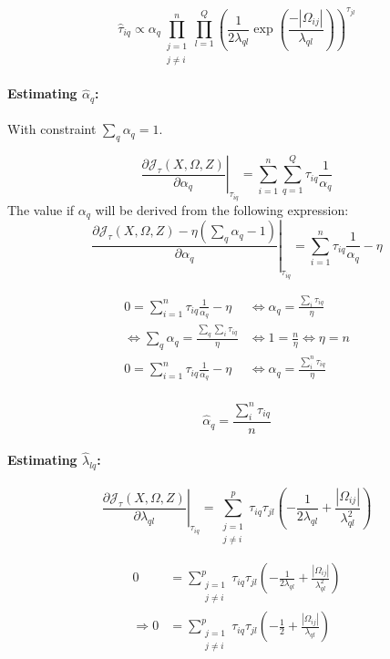 \documentclass[10pt]{article}
\begin{document}
\[\boxed{\hat{\tau}_{iq} \propto \alpha_q \prod_{\substack{j = 1 \\  j\neq i}}^n \prod_{l = 1}^Q \left( \frac{1}{2\lambda_{ql}} \exp\left(\frac{-|\Omega_{ij}|}{\lambda_{ql}} \right) \right)^{\tau_{jl}}} \]


\paragraph{Estimating $\hat{\alpha}_{q}$:} With constraint $\sum_q \alpha_q = 1$.

\[ \left. \frac{\partial\mathcal{J}_\tau(X, \Omega, Z)}{\partial \alpha_q}  \right| _{\tau_{iq}} = \sum_{i=1}^n \sum_{q = 1}^Q \tau_{iq} \frac{1}{\alpha_q}\]
The value if $\alpha_q$ will be derived from the following expression:
\[ \left. \frac{\partial\mathcal{J}_\tau(X, \Omega, Z)- \eta (\sum_q \alpha_q - 1)}{\partial \alpha_q}  \right| _{\tau_{iq}}  = \sum_{i=1}^n \tau_{iq} \frac{1}{\alpha_q} - \eta  \]

\begin{align*}
0 = \sum_{i=1}^n  \tau_{iq} \frac{1}{\alpha_q} - \eta &\Leftrightarrow \alpha_q  =  \frac{\sum_i \tau_{iq}}{\eta} \\
\Leftrightarrow \sum_q \alpha_q  =  \frac{ \sum_q \sum_i \tau_{iq}}{\eta} &\Leftrightarrow 1  =  \frac{n}{\eta} \Leftrightarrow \boxed{\eta  =  n} \\
0 = \sum_{i=1}^n  \tau_{iq} \frac{1}{\alpha_q} - \eta &\Leftrightarrow \alpha_q  =  \frac{\sum_i^n \tau_{iq}}{\eta} \\
\end{align*}

\[ \boxed{\hat{\alpha}_q  =  \frac{\sum_i^n \tau_{iq}}{n}}\]

\paragraph{Estimating $\hat{\lambda}_{lq}$:}

\[ \left. \frac{\partial\mathcal{J}_\tau(X, \Omega, Z)}{\partial \lambda_{ql}}  \right| _{\tau_{iq}} = \sum_{\substack{j = 1 \\  j\neq i}}^p \tau_{iq}\tau_{jl}\left( -\frac{1}{2\lambda_{ql}} + \frac{|\Omega_{ij}|}{\lambda_{ql}^2}\right)\]

\begin{align*}
0 &=  \sum_{\substack{j = 1 \\  j\neq i}}^p\tau_{iq}\tau_{jl}\left( -\frac{1}{2\lambda_{ql}} + \frac{|\Omega_{ij}|}{\lambda_{ql}^2}\right) \\
\Rightarrow 0	& = \sum_{\substack{j = 1 \\  j\neq i}}^p \tau_{iq}\tau_{jl}\left( -\frac{1}{2} + \frac{|\Omega_{ij}|}{\lambda_{ql}}\right) \\
\end{align*}
\end{document}
